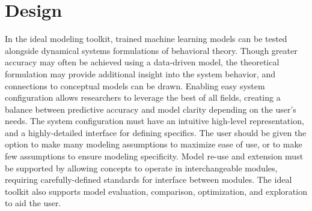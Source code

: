 \section{Design}
In the ideal modeling toolkit, trained machine learning models can be tested alongside dynamical systems formulations of behavioral theory. 
Though greater accuracy may often be achieved using a data-driven model, the theoretical formulation may provide additional insight into the system behavior, and connections to conceptual models can be drawn. 
Enabling easy system configuration allows researchers to leverage the best of all fields, creating a balance between predictive accuracy and model clarity depending on the user’s needs. 
The system configuration must have an intuitive high-level representation, and a highly-detailed interface for defining specifics. 
The user should be given the option to make many modeling assumptions to maximize ease of use, or to make few assumptions to ensure modeling specificity. 
Model re-use and extension must be supported by allowing concepts to operate in interchangeable modules, requiring carefully-defined standards for interface between modules. 
The ideal toolkit also supports model evaluation, comparison, optimization, and exploration to aid the user.
